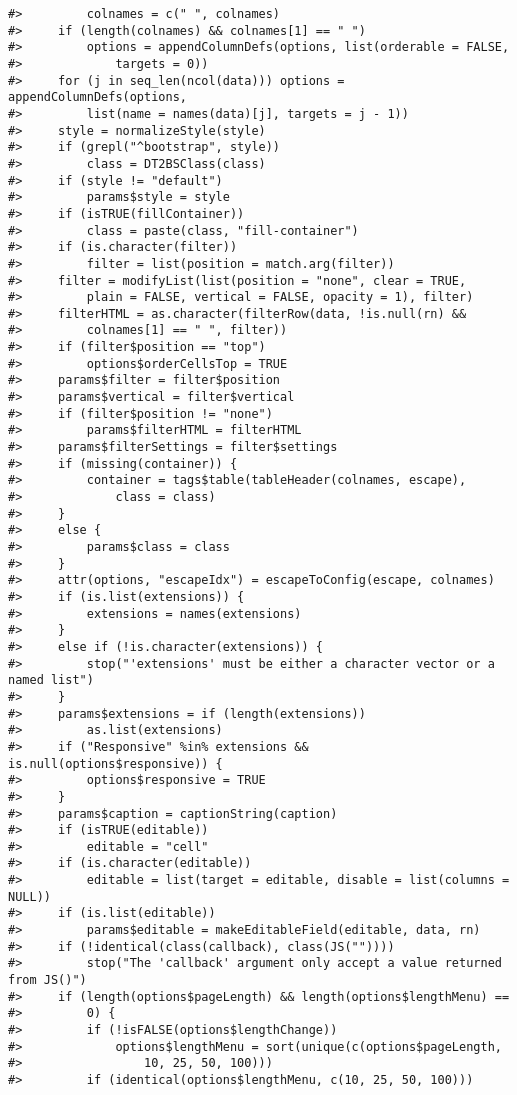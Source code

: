 \documentclass[
]{book}
\begin{document}
\begin{verbatim}
#>         colnames = c(" ", colnames)
#>     if (length(colnames) && colnames[1] == " ") 
#>         options = appendColumnDefs(options, list(orderable = FALSE, 
#>             targets = 0))
#>     for (j in seq_len(ncol(data))) options = appendColumnDefs(options, 
#>         list(name = names(data)[j], targets = j - 1))
#>     style = normalizeStyle(style)
#>     if (grepl("^bootstrap", style)) 
#>         class = DT2BSClass(class)
#>     if (style != "default") 
#>         params$style = style
#>     if (isTRUE(fillContainer)) 
#>         class = paste(class, "fill-container")
#>     if (is.character(filter)) 
#>         filter = list(position = match.arg(filter))
#>     filter = modifyList(list(position = "none", clear = TRUE, 
#>         plain = FALSE, vertical = FALSE, opacity = 1), filter)
#>     filterHTML = as.character(filterRow(data, !is.null(rn) && 
#>         colnames[1] == " ", filter))
#>     if (filter$position == "top") 
#>         options$orderCellsTop = TRUE
#>     params$filter = filter$position
#>     params$vertical = filter$vertical
#>     if (filter$position != "none") 
#>         params$filterHTML = filterHTML
#>     params$filterSettings = filter$settings
#>     if (missing(container)) {
#>         container = tags$table(tableHeader(colnames, escape), 
#>             class = class)
#>     }
#>     else {
#>         params$class = class
#>     }
#>     attr(options, "escapeIdx") = escapeToConfig(escape, colnames)
#>     if (is.list(extensions)) {
#>         extensions = names(extensions)
#>     }
#>     else if (!is.character(extensions)) {
#>         stop("'extensions' must be either a character vector or a named list")
#>     }
#>     params$extensions = if (length(extensions)) 
#>         as.list(extensions)
#>     if ("Responsive" %in% extensions && is.null(options$responsive)) {
#>         options$responsive = TRUE
#>     }
#>     params$caption = captionString(caption)
#>     if (isTRUE(editable)) 
#>         editable = "cell"
#>     if (is.character(editable)) 
#>         editable = list(target = editable, disable = list(columns = NULL))
#>     if (is.list(editable)) 
#>         params$editable = makeEditableField(editable, data, rn)
#>     if (!identical(class(callback), class(JS("")))) 
#>         stop("The 'callback' argument only accept a value returned from JS()")
#>     if (length(options$pageLength) && length(options$lengthMenu) == 
#>         0) {
#>         if (!isFALSE(options$lengthChange)) 
#>             options$lengthMenu = sort(unique(c(options$pageLength, 
#>                 10, 25, 50, 100)))
#>         if (identical(options$lengthMenu, c(10, 25, 50, 100))) 

\end{verbatim}
\end{document}
